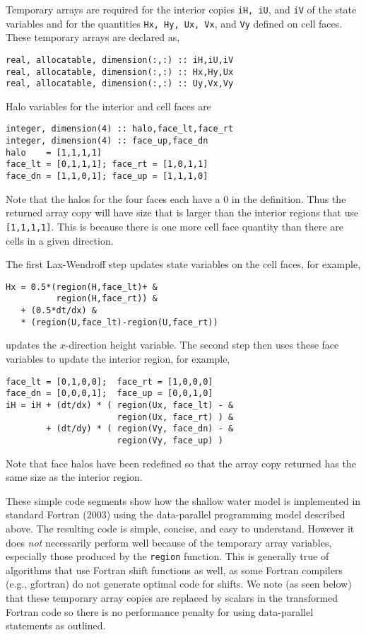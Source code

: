 Temporary arrays are required for the interior copies {\tt iH, iU}, and
{\tt iV} of the state variables and for the quantities {\tt Hx, Hy, Ux,
Vx}, and {\tt Vy} defined on cell faces.  These temporary arrays are declared as,

{\small
\begin{verbatim}
real, allocatable, dimension(:,:) :: iH,iU,iV
real, allocatable, dimension(:,:) :: Hx,Hy,Ux
real, allocatable, dimension(:,:) :: Uy,Vx,Vy
\end{verbatim}
}

Halo variables for the interior and cell faces are

{\small
\begin{verbatim}
integer, dimension(4) :: halo,face_lt,face_rt
integer, dimension(4) :: face_up,face_dn
halo    = [1,1,1,1]
face_lt = [0,1,1,1]; face_rt = [1,0,1,1]
face_dn = [1,1,0,1]; face_up = [1,1,1,0]
\end{verbatim}
}

\noindent
Note that the halos for the four faces each have a 0 in the
definition. Thus the returned array copy will have size that is larger
than the interior regions that use {\tt [1,1,1,1]}.  This is because
there is one more cell face quantity than there are cells in a given
direction.

The first Lax-Wendroff step updates state variables on the cell
faces, for example,

{\small
\begin{verbatim}
Hx = 0.5*(region(H,face_lt)+ &
          region(H,face_rt)) &
   + (0.5*dt/dx) &
   * (region(U,face_lt)-region(U,face_rt))
\end{verbatim}
}

\noindent
updates the $x$-direction height variable.  The second step then uses
these face variables to update the interior region, for example,

{\small
\begin{verbatim}
face_lt = [0,1,0,0];  face_rt = [1,0,0,0]
face_dn = [0,0,0,1];  face_up = [0,0,1,0]
iH = iH + (dt/dx) * ( region(Ux, face_lt) - &
                      region(Ux, face_rt) ) &
        + (dt/dy) * ( region(Vy, face_dn) - &
                      region(Vy, face_up) )
\end{verbatim}
}

\noindent
Note that face halos have been redefined so that the array copy
returned has the same size as the interior region.

These simple code segments show how the shallow water model is
implemented in standard Fortran (2003) using the data-parallel
programming model described above.  The resulting code is simple,
concise, and easy to understand.  However it does \emph{not}
necessarily perform well because of the temporary array variables,
especially those produced by the {\tt region} function.  This is
generally true of algorithms that use Fortran shift functions as well,
as some Fortran compilers (e.g., gfortran) do not generate optimal
code for shifts.  We note (as seen below) that these temporary array
copies are replaced by scalars in the transformed Fortran code so
there is no performance penalty for using data-parallel statements as
outlined.
